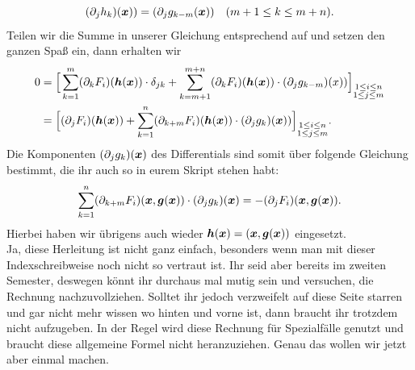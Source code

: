 \begin{equation*}
    (\partial_j h_k)({{\text{\boldmath${x}$}}}))=(\partial_j g_{k-m}({{\text{\boldmath${x}$}}})) \quad (m+1 \leq k \leq m+n).
\end{equation*}
Teilen wir die Summe in unserer Gleichung entsprechend auf und setzen den ganzen Spaß ein, dann erhalten wir
\begin{align*}
    0&=\Big[ \sum_{k=1}^m (\partial_k F_i)({{\text{\boldmath${h}$}}}({{\text{\boldmath${x}$}}}))\cdot\delta_{jk} + \sum_{k=m+1}^{m+n} (\partial_k F_i)({{\text{\boldmath${h}$}}}({{\text{\boldmath${x}$}}}))\cdot(\partial_j g_{k-m})(x))\Big]_{\substack{1\leq i\leq n \\ 1\leq j\leq m}} \\ &= \Big[ (\partial_j F_i)({{\text{\boldmath${h}$}}}({{\text{\boldmath${x}$}}})) + \sum_{k=1}^{n} (\partial_{k+m} F_i)({{\text{\boldmath${h}$}}}({{\text{\boldmath${x}$}}}))\cdot(\partial_j g_{k})({{\text{\boldmath${x}$}}}))\Big]_{\substack{1\leq i\leq n \\ 1\leq j\leq m}}.
\end{align*}
Die Komponenten $(\partial_j g_k)({{\text{\boldmath${x}$}}})$ des Differentials sind somit über folgende Gleichung bestimmt, die ihr auch so in eurem Skript stehen habt:
\begin{equation*}
    \sum_{k=1}^{n} (\partial_{k+m} F_i)({{\text{\boldmath${x}$}}},{{\text{\boldmath${g}$}}}({{\text{\boldmath${x}$}}}))\cdot(\partial_j g_{k})({{\text{\boldmath${x}$}}}) = - (\partial_j F_i)({{\text{\boldmath${x}$}}},{{\text{\boldmath${g}$}}}({{\text{\boldmath${x}$}}})).
\end{equation*}
Hierbei haben wir übrigens auch wieder ${{\text{\boldmath${h}$}}}({{\text{\boldmath${x}$}}})=({{\text{\boldmath${x}$}}},{{\text{\boldmath${g}$}}}({{\text{\boldmath${x}$}}}))$ eingesetzt. \\

Ja, diese Herleitung ist nicht ganz einfach, besonders wenn man mit dieser Indexschreibweise noch nicht so vertraut ist. Ihr seid aber bereits im zweiten Semester, deswegen könnt ihr durchaus mal mutig sein und versuchen, die Rechnung nachzuvollziehen. Solltet ihr jedoch verzweifelt auf diese Seite starren und gar nicht mehr wissen wo hinten und vorne ist, dann braucht ihr trotzdem nicht aufzugeben. In der Regel wird diese Rechnung für Spezialfälle genutzt und braucht diese allgemeine Formel nicht heranzuziehen. Genau das wollen wir jetzt aber einmal machen.

